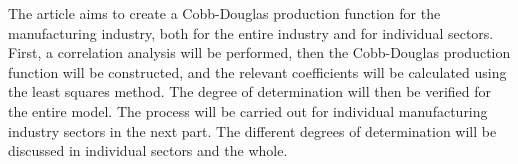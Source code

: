 
\begin{Abstrakt}
    The article aims to create a Cobb-Douglas production function for the manufacturing industry, both for the entire industry and for individual sectors. First, a correlation analysis will be performed, then the Cobb-Douglas production function will be constructed, and the relevant coefficients will be calculated using the least squares method. The degree of determination will then be verified for the entire model. The process will be carried out for individual manufacturing industry sectors in the next part. The different degrees of determination will be discussed in individual sectors and the whole.
\end{Abstrakt}



\clearpage